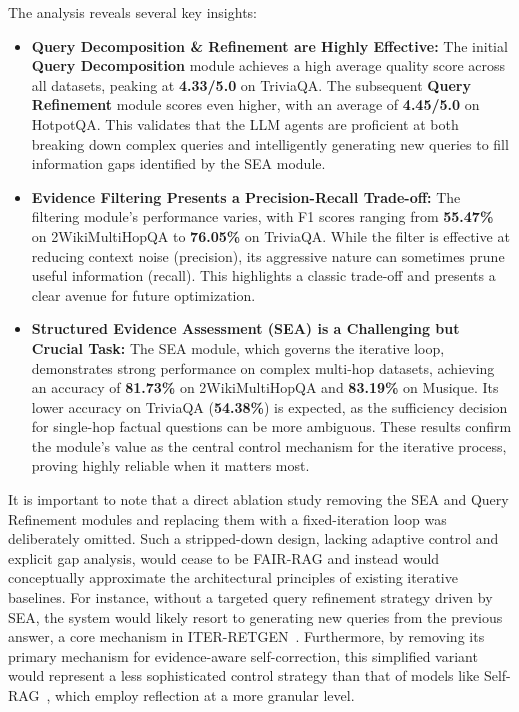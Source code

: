 \documentclass[11pt]{article}
\begin{document}
The analysis reveals several key insights:

\begin{itemize}
    \item \textbf{Query Decomposition \& Refinement are Highly Effective:} The initial \textbf{Query Decomposition} module achieves a high average quality score across all datasets, peaking at \textbf{4.33/5.0} on TriviaQA. The subsequent \textbf{Query Refinement} module scores even higher, with an average of \textbf{4.45/5.0} on HotpotQA. This validates that the LLM agents are proficient at both breaking down complex queries and intelligently generating new queries to fill information gaps identified by the SEA module.
    
    \item \textbf{Evidence Filtering Presents a Precision-Recall Trade-off:} The filtering module's performance varies, with F1 scores ranging from \textbf{55.47\%} on 2WikiMultiHopQA to \textbf{76.05\%} on TriviaQA. While the filter is effective at reducing context noise (precision), its aggressive nature can sometimes prune useful information (recall). This highlights a classic trade-off and presents a clear avenue for future optimization.
    
    \item \textbf{Structured Evidence Assessment (SEA) is a Challenging but Crucial Task:} The SEA module, which governs the iterative loop, demonstrates strong performance on complex multi-hop datasets, achieving an accuracy of \textbf{81.73\%} on 2WikiMultiHopQA and \textbf{83.19\%} on Musique. Its lower accuracy on TriviaQA (\textbf{54.38\%}) is expected, as the sufficiency decision for single-hop factual questions can be more ambiguous. These results confirm the module's value as the central control mechanism for the iterative process, proving highly reliable when it matters most.
\end{itemize}

It is important to note that a direct ablation study removing the SEA and Query Refinement modules and replacing them with a fixed-iteration loop was deliberately omitted. Such a stripped-down design, lacking adaptive control and explicit gap analysis, would cease to be FAIR-RAG and instead would conceptually approximate the architectural principles of existing iterative baselines. For instance, without a targeted query refinement strategy driven by SEA, the system would likely resort to generating new queries from the previous answer, a core mechanism in ITER-RETGEN~\cite{shao2023iter}. Furthermore, by removing its primary mechanism for evidence-aware self-correction, this simplified variant would represent a less sophisticated control strategy than that of models like Self-RAG~\cite{asai2023self}, which employ reflection at a more granular level.
\end{document}
